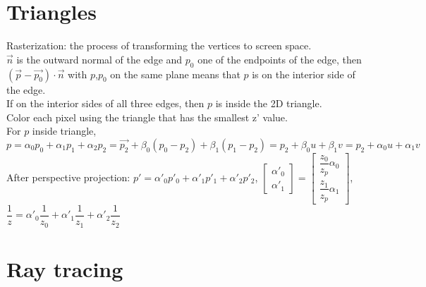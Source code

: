 \documentclass[12pt]{article}
\begin{document}
\section{Triangles}\noindent
Rasterization: the process of transforming the vertices to screen space.\\
$\vec{n}$ is the outward normal of the edge and $p_0$ one of the endpoints of the edge, 
then $(\vec{p}-\vec{p_0})\cdot\vec{n}$ with $p$,$p_0$ on the same plane means that $p$ is on the interior side of the edge.\\
If on the interior sides of all three edges, then $p$ is inside the 2D triangle.\\
Color each pixel using the triangle that has the smallest z' value.\\
For $p$ inside triangle, $p=\alpha_0p_0+\alpha_1p_1+\alpha_2p_2=\vec{p_2}+\beta_0(p_0-p_2)+\beta_1(p_1-p_2)
=p_2+\beta_0u+\beta_1v=p_2+\alpha_0u+\alpha_1v$\\
After perspective projection: $p'=\alpha'_0p'_0+\alpha'_1p'_1+\alpha'_2p'_2$, $\begin{bmatrix}
    \alpha'_0\\ \alpha'_1
\end{bmatrix}=\begin{bmatrix}
    \dfrac{z_0}{z_p}\alpha_0\\ \dfrac{z_1}{z_p}\alpha_1
\end{bmatrix}$, $\dfrac{1}{z}=\alpha'_0\dfrac{1}{z_0}+\alpha'_1\dfrac{1}{z_1}+\alpha'_2\dfrac{1}{z_2}$
\section{Ray tracing}\noindent
\end{document}
